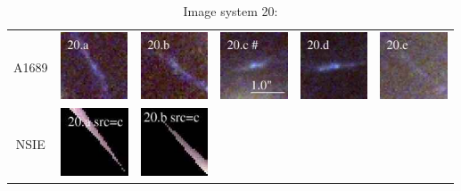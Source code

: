 \documentclass[useAMS,usenatbib]{mn2e}
\begin{document}
\begin{table}
  \caption{Image system 20:}\vspace{0mm}
  \begin{tabular}{cccccc}
    \multicolumn{1}{m{1cm}}{{\Large A1689}}
    & \multicolumn{1}{m{1.7cm}}{\includegraphics[height=2.00cm,clip]{figs/nsie_img/rgb.img_20_a.ps}}
    & \multicolumn{1}{m{1.7cm}}{\includegraphics[height=2.00cm,clip]{figs/nsie_img/rgb.img_20_b.ps}}
    & \multicolumn{1}{m{1.7cm}}{\includegraphics[height=2.00cm,clip]{figs/nsie_img/rgb.img_20_c.ps}}
    & \multicolumn{1}{m{1.7cm}}{\includegraphics[height=2.00cm,clip]{figs/nsie_img/rgb.img_20_d.ps}}
    & \multicolumn{1}{m{1.7cm}}{\includegraphics[height=2.00cm,clip]{figs/nsie_img/rgb.img_20_e.ps}} \\
    \multicolumn{1}{m{1cm}}{{\Large NSIE}}
    & \multicolumn{1}{m{1.7cm}}{\includegraphics[height=2.00cm,clip]{figs/nsie_img/rgb.pre_20_a_c_tri.ps}}
    & \multicolumn{1}{m{1.7cm}}{\includegraphics[height=2.00cm,clip]{figs/nsie_img/rgb.pre_20_b_c_tri.ps}}

\end{tabular}
\end{table}
\end{document}
